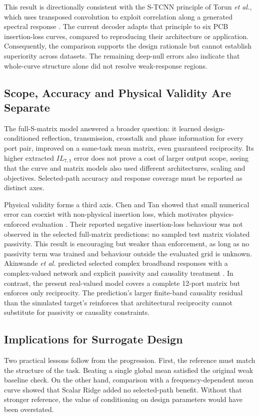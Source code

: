 This result is directionally consistent with the S-TCNN principle of Torun
\textit{et al.}, which uses transposed convolution to exploit correlation along
a generated spectral response \cite{torun2019spectral}. The current decoder
adapts that principle to six PCB insertion-loss curves, compared to reproducing
their architecture or application. Consequently, the comparison supports the
design rationale but cannot establish superiority across datasets. The
remaining deep-null errors also indicate that whole-curve structure alone did
not resolve weak-response regions.

\subsection{Scope, Accuracy and Physical Validity Are Separate}
The full-S-matrix model answered a broader question: it learned
design-conditioned reflection, transmission, crosstalk and phase information
for every port pair, improved on a same-task mean matrix, even guaranteed
reciprocity. Its higher extracted $IL_{7,1}$ error does not prove a cost of
larger output scope, seeing that the curve and matrix models also used different
architectures, scaling and objectives. Selected-path accuracy and response
coverage must be reported as distinct axes.

Physical validity forms a third axis. Chen and Tan showed that small numerical
error can coexist with non-physical insertion loss, which motivates physics-enforced
evaluation \cite{chen2021physics}. Their reported negative insertion-loss
behaviour was not observed in the selected full-matrix predictions: no sampled
test matrix violated passivity. This result is encouraging but weaker than enforcement, as long as no passivity term was trained and behaviour outside the evaluated grid is unknown.
Akinwande \textit{et al.} predicted selected complex broadband responses with a
complex-valued network and explicit passivity and causality treatment
\cite{akinwande2024complex}. In contrast, the present real-valued model covers
a complete 12-port matrix but enforces only reciprocity. The prediction's larger
finite-band causality residual than the simulated target's reinforces that
architectural reciprocity cannot substitute for passivity or causality
constraints.

\subsection{Implications for Surrogate Design}
Two practical lessons follow from the progression. First, the reference must
match the structure of the task. Beating a single global mean satisfied the original
weak baseline check. On the other hand, comparison with a frequency-dependent mean curve
showed that Scalar Ridge added no selected-path benefit. Without that stronger
reference, the value of conditioning on design parameters would have
been overstated.

